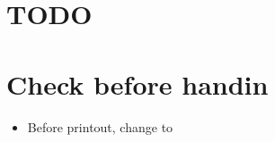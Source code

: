 \section{TODO}

\section{Check before handin}
\begin{itemize}
    \item Before printout, change to %
\end{itemize}